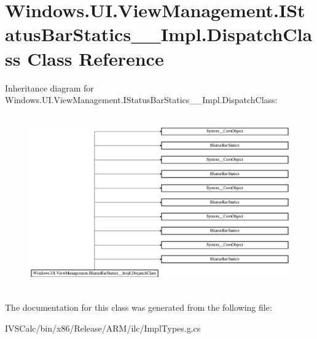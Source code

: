 \hypertarget{class_windows_1_1_u_i_1_1_view_management_1_1_i_status_bar_statics_____impl_1_1_dispatch_class}{}\section{Windows.\+U\+I.\+View\+Management.\+I\+Status\+Bar\+Statics\+\_\+\+\_\+\+Impl.\+Dispatch\+Class Class Reference}
\label{class_windows_1_1_u_i_1_1_view_management_1_1_i_status_bar_statics_____impl_1_1_dispatch_class}
Inheritance diagram for Windows.\+U\+I.\+View\+Management.\+I\+Status\+Bar\+Statics\+\_\+\+\_\+\+Impl.\+Dispatch\+Class\+:\begin{figure}[H]
\begin{center}
\leavevmode
\includegraphics[height=7.567567cm]{class_windows_1_1_u_i_1_1_view_management_1_1_i_status_bar_statics_____impl_1_1_dispatch_class}
\end{center}
\end{figure}


The documentation for this class was generated from the following file\+:\begin{DoxyCompactItemize}
\item 
I\+V\+S\+Calc/bin/x86/\+Release/\+A\+R\+M/ilc/Impl\+Types.\+g.\+cs\end{DoxyCompactItemize}
